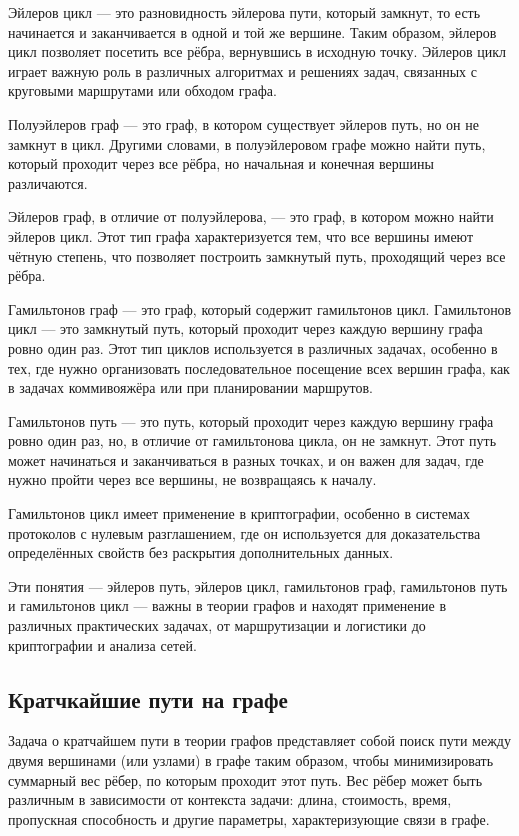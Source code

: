 Эйлеров цикл — это разновидность эйлерова пути, который замкнут, то есть начинается и заканчивается в одной и той же вершине. Таким образом, эйлеров цикл позволяет посетить все рёбра, вернувшись в исходную точку. Эйлеров цикл играет важную роль в различных алгоритмах и решениях задач, связанных с круговыми маршрутами или обходом графа.

Полуэйлеров граф — это граф, в котором существует эйлеров путь, но он не замкнут в цикл. Другими словами, в полуэйлеровом графе можно найти путь, который проходит через все рёбра, но начальная и конечная вершины различаются.

Эйлеров граф, в отличие от полуэйлерова, — это граф, в котором можно найти эйлеров цикл. Этот тип графа характеризуется тем, что все вершины имеют чётную степень, что позволяет построить замкнутый путь, проходящий через все рёбра.

Гамильтонов граф — это граф, который содержит гамильтонов цикл. Гамильтонов цикл — это замкнутый путь, который проходит через каждую вершину графа ровно один раз. Этот тип циклов используется в различных задачах, особенно в тех, где нужно организовать последовательное посещение всех вершин графа, как в задачах коммивояжёра или при планировании маршрутов.

Гамильтонов путь — это путь, который проходит через каждую вершину графа ровно один раз, но, в отличие от гамильтонова цикла, он не замкнут. Этот путь может начинаться и заканчиваться в разных точках, и он важен для задач, где нужно пройти через все вершины, не возвращаясь к началу.

Гамильтонов цикл имеет применение в криптографии, особенно в системах протоколов с нулевым разглашением, где он используется для доказательства определённых свойств без раскрытия дополнительных данных.

Эти понятия — эйлеров путь, эйлеров цикл, гамильтонов граф, гамильтонов путь и гамильтонов цикл — важны в теории графов и находят применение в различных практических задачах, от маршрутизации и логистики до криптографии и анализа сетей.

\subsection{Кратчкайшие пути на графе}

Задача о кратчайшем пути в теории графов представляет собой поиск пути между двумя вершинами (или узлами) в графе таким образом, чтобы минимизировать суммарный вес рёбер, по которым проходит этот путь. Вес рёбер может быть различным в зависимости от контекста задачи: длина, стоимость, время, пропускная способность и другие параметры, характеризующие связи в графе.

